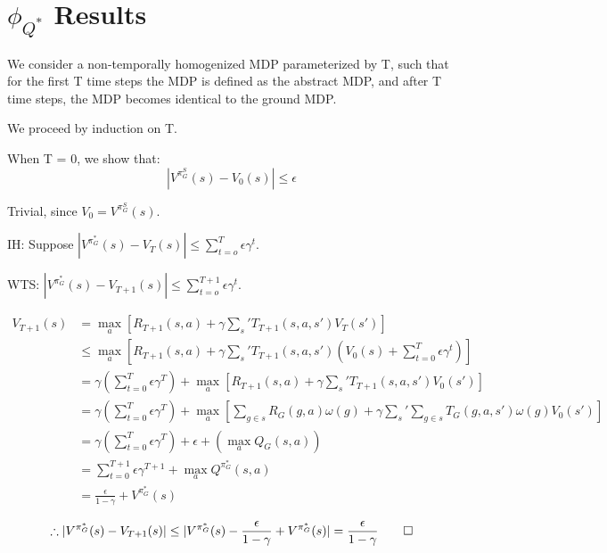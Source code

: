 \documentclass[11pt]{amsart}
\begin{document}
\newpage
\section{$\phi_{Q^*}$ Results}

We consider a non-temporally homogenized MDP parameterized by T, such that for the first T time steps the MDP is defined as the abstract MDP, and after T time steps, the MDP becomes identical to the ground MDP.

We proceed by induction on T.


When T = 0, we show that:
\begin{equation}
|V^{\pi_G^S}(s) - V_0(s)| \leq \epsilon
\end{equation}

Trivial, since $V_0 = V^{\pi_G^S}(s)$.


IH: Suppose $|V^{\pi_G^*}(s) - V_T(s)| \leq \sum_{t=o}^T \epsilon \gamma^t$.

WTS: $|V^{\pi_G^*}(s) - V_{T+1}(s)| \leq \sum_{t=o}^{T+1} \epsilon \gamma^t$.

\begin{align*}
V_{T+1}(s) &= \max_a \left[R_{T+1}(s,a) + \gamma \sum_s' T_{T+1}(s,a,s')V_T(s')\right] \\
&\leq \max_a \left[R_{T+1}(s,a) + \gamma \sum_s' T_{T+1}(s,a,s')\left(V_0(s) + \sum_{t=0}^T\epsilon\gamma^t \right) \right] \\
&= \gamma\left(\sum_{t=0}^T\epsilon\gamma^T\right) + \max_a \left[R_{T+1}(s,a) + \gamma \sum_s' T_{T+1}(s,a,s')V_0(s') \right] \\
&= \gamma\left(\sum_{t=0}^T\epsilon\gamma^T\right) + \max_a \left[\sum_{g \in s} R_{G}(g,a)\omega(g) + \gamma \sum_s' \sum_{g \in s}T_G(g,a,s')\omega(g)V_0(s') \right] \\
&= \gamma\left(\sum_{t=0}^T\epsilon\gamma^T\right) + \epsilon + \left(\max_a Q_G(s,a)\right) \\
&= \sum_{t=0}^{T+1} \epsilon \gamma^{T+1} + \max_a Q^{\pi_G^*}(s,a) \\
&= \frac{\epsilon}{1-\gamma} + V^{\pi_G^*}(s) \\
\end{align*}
\begin{equation}
\therefore |V^{\pi_G^*}(s) - V_{T+1}(s)| \leq | V^{\pi_G^*}(s) - \frac{\epsilon}{1-\gamma} + V^{\pi_G^*}(s)| = \frac{\epsilon}{1-\gamma} \qed
\end{equation}
\end{document}
